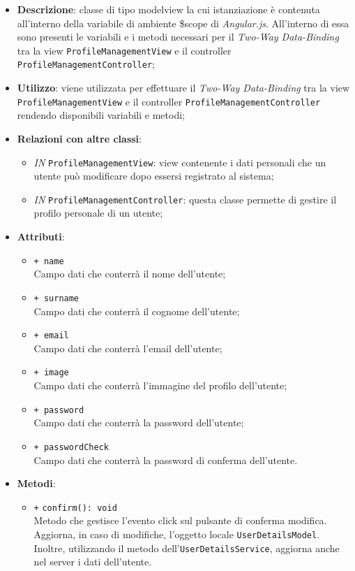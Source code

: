 	\begin{itemize}
		\item \textbf{Descrizione}: classe di tipo modelview la cui istanziazione è contenuta all'interno della variabile di ambiente \$scope di \textit{Angular.js}. All'interno di essa sono presenti le variabili e i metodi necessari per il \textit{Two-Way Data-Binding} tra la view \texttt{ProfileManagementView} e il controller \texttt{ProfileManagementController};
		\item \textbf{Utilizzo}: viene utilizzata per effettuare il \textit{Two-Way Data-Binding} tra la view \texttt{ProfileManagementView} e il controller \texttt{ProfileManagementController} rendendo disponibili variabili e metodi;
		\item \textbf{Relazioni con altre classi}: 
		\begin{itemize}
			\item \textit{IN} \texttt{ProfileManagementView}: view contenente i dati personali che un utente può modificare dopo essersi registrato al sistema; 
			\item \textit{IN} \texttt{ProfileManagementController}: questa classe permette di gestire il profilo personale di un utente;
		\end{itemize}
		\item \textbf{Attributi}: 
		\begin{itemize}
				\item \texttt{+ name} \\ Campo dati che conterrà il nome dell'utente;
				\item \texttt{+ surname} \\ Campo dati che conterrà il cognome dell'utente;
				\item \texttt{+ email} \\ Campo dati che conterrà l'email dell'utente;
				\item \texttt{+ image} \\ Campo dati che conterrà l'immagine del profilo dell'utente;
				\item \texttt{+ password} \\ Campo dati che conterrà la password dell'utente;
				\item \texttt{+ passwordCheck} \\ Campo dati che conterrà la password di conferma dell'utente.
		\end{itemize}
		\item \textbf{Metodi}: 
		\begin{itemize}
			\item \texttt{+} \texttt{confirm(): void} \\
			Metodo che gestisce l’evento click sul pulsante di conferma modifica. Aggiorna, in caso di modifiche, l'oggetto locale \texttt{UserDetailsModel}. Inoltre, utilizzando il metodo dell'\texttt{UserDetailsService}, aggiorna anche nel server i dati dell'utente.
		\end{itemize}
	\end{itemize}	

